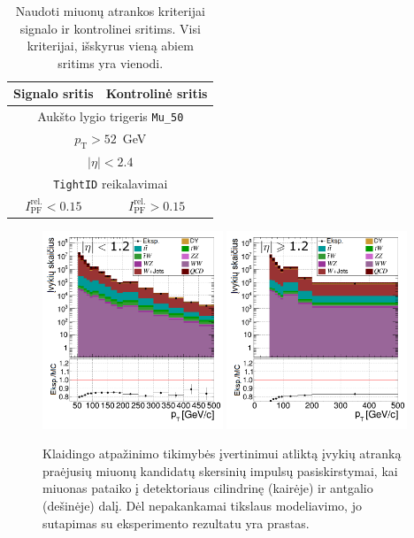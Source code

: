 \documentclass[a4paper, 12pt, oneside]{article}
\newcommand{\ttt}[1]{\texttt{#1}}
\newcommand{\pT}{p_{\mathrm{T}}}
\begin{document}
\begin{table}[t!]
	\begin{tabular}{|c|c|}
		\hline
		\textbf{Signalo sritis} & \textbf{Kontrolinė sritis} \\
		\hline\hline
		\multicolumn{2}{|c|}{Aukšto lygio trigeris \ttt{Mu\_50}} \\
		\hline
		\multicolumn{2}{|c|}{$\pT>52$~GeV} \\
		\hline
		\multicolumn{2}{|c|}{$|\eta|<2.4$} \\
		\hline
		\multicolumn{2}{|c|}{\ttt{TightID} reikalavimai} \\
		\hline
		$I_{\mathrm{PF}}^{\mathrm{rel.}} < 0.15$ & $I_{\mathrm{PF}}^{\mathrm{rel.}} > 0.15$ \\
		\hline
	\end{tabular}
	\caption{\label{table:FR} Naudoti miuonų atrankos kriterijai signalo ir kontrolinei sritims. Visi kriterijai, išskyrus vieną
	abiem sritims yra vienodi.}
\end{table}

\begin{figure}[b!]
	\includegraphics[width=0.48\textwidth]{Kursinis3/FRest_pT_deno_barrel.png}
	\includegraphics[width=0.48\textwidth]{Kursinis3/FRest_pT_deno_endcap.png}
	\vspace{-0.5cm}
	\caption{\label{fig:jet_pT_before}
		Klaidingo atpažinimo tikimybės įvertinimui atliktą įvykių atranką praėjusių miuonų kandidatų skersinių impulsų
		pasiskirstymai, kai miuonas pataiko į detektoriaus cilindrinę (kairėje) ir antgalio (dešinėje) dalį.
		Dėl nepakankamai tikslaus modeliavimo, jo sutapimas su eksperimento rezultatu yra prastas.}
\end{figure}
\end{document}
